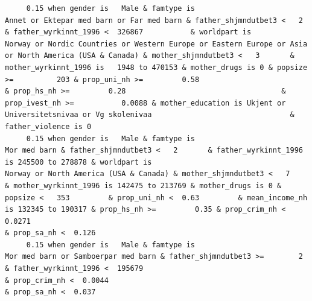 \documentclass[
  letterpaper,
  DIV=11,
  numbers=noendperiod]{scrreprt}
\begin{document}
\begin{verbatim}
     0.15 when gender is   Male & famtype is                        Annet or Ektepar med barn or Far med barn & father_shjmndutbet3 <   2       & father_wyrkinnt_1996 <  326867           & worldpart is                              Norway or Nordic Countries or Western Europe or Eastern Europe or Asia or North America (USA & Canada) & mother_shjmndutbet3 <   3       & mother_wyrkinnt_1996 is   1948 to 470153 & mother_drugs is 0 & popsize >=          203 & prop_uni_nh >=         0.58                                      & prop_hs_nh >=         0.28                                    & prop_ivest_nh >=           0.0088 & mother_education is Ukjent or Universitetsnivaa or Vg skolenivaa                                & father_violence is 0                                                                                                               
     0.15 when gender is   Male & famtype is                                                     Mor med barn & father_shjmndutbet3 <   2       & father_wyrkinnt_1996 is 245500 to 278878 & worldpart is                                                                                              Norway or North America (USA & Canada) & mother_shjmndutbet3 <   7       & mother_wyrkinnt_1996 is 142475 to 213769 & mother_drugs is 0 & popsize <   353         & prop_uni_nh <  0.63         & mean_income_nh is 132345 to 190317 & prop_hs_nh >=         0.35 & prop_crim_nh <  0.0271                                                                                                                  & prop_sa_nh <  0.126                                                                                                                                               
     0.15 when gender is   Male & famtype is                              Mor med barn or Samboerpar med barn & father_shjmndutbet3 >=        2 & father_wyrkinnt_1996 <  195679                                                                                                                                                                                                                                                                                                                                                                                         & prop_crim_nh <  0.0044                                                                                                                  & prop_sa_nh <  0.037                                                                                                                                               

\end{verbatim}
\end{document}
